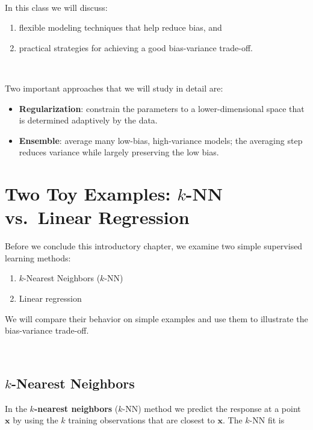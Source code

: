 \documentclass[
]{book}
\providecommand{\tightlist}{%
  \setlength{\itemsep}{0pt}\setlength{\parskip}{0pt}}
\begin{document}
~

In this class we will discuss:

\begin{enumerate}
\def\labelenumi{(\roman{enumi})}
\item
  flexible modeling techniques that help reduce bias, and
\item
  practical strategies for achieving a good bias-variance trade-off.
\end{enumerate}

~

Two important approaches that we will study in detail are:

\begin{itemize}
\item
  \textbf{Regularization}: constrain the parameters to a lower-dimensional space that is determined adaptively by the data.
\item
  \textbf{Ensemble}: average many low-bias, high-variance models; the averaging step reduces variance while largely preserving the low bias.
\end{itemize}

\section{\texorpdfstring{Two Toy Examples: \(k\)-NN vs.~Linear Regression}{Two Toy Examples: k-NN vs.~Linear Regression}}\label{two-toy-examples-k-nn-vs.-linear-regression}

Before we conclude this introductory chapter, we examine two simple supervised learning methods:

\begin{enumerate}
\def\labelenumi{(\roman{enumi})}
\tightlist
\item
  \(k\)-Nearest Neighbors (\(k\)-NN)\\
\item
  Linear regression
\end{enumerate}

We will compare their behavior on simple examples and use them to illustrate the bias-variance trade-off.

~

\subsection{\texorpdfstring{\(k\)-Nearest Neighbors}{k-Nearest Neighbors}}\label{k-nearest-neighbors}

In the \textbf{\(k\)-nearest neighbors} (\(k\)-NN) method we predict the response at a point \(\mathbf{x}\) by using the \(k\) training observations that are closest to \(\mathbf{x}\). The \(k\)-NN fit is
\end{document}
